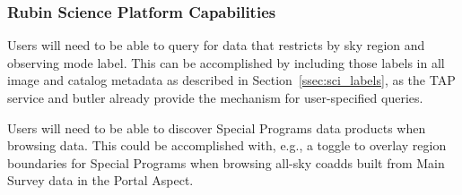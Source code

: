 \subsubsection{Rubin Science Platform Capabilities}\label{sssec:sci_rsp}

Users will need to be able to query for data that restricts by sky region and 
observing mode label. 
This can be accomplished by including those labels in all image and catalog 
metadata as described in Section~\ref{ssec:sci_labels}, as the TAP service 
and butler already provide the mechanism for user-specified queries.

Users will need to be able to discover Special Programs data products when 
browsing data.
This could be accomplished with, e.g., a toggle to overlay region boundaries
for Special Programs when browsing all-sky coadds built from Main Survey data
in the Portal Aspect.


